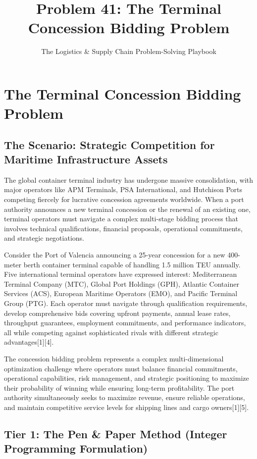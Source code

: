 \documentclass{article}
\title{Problem 41: The Terminal Concession Bidding Problem}
\author{The Logistics \& Supply Chain Problem-Solving Playbook}
\date{}
\begin{document}
\maketitle

\section{The Terminal Concession Bidding Problem}

\subsection{The Scenario: Strategic Competition for Maritime Infrastructure Assets}

The global container terminal industry has undergone massive consolidation, with major operators like APM Terminals, PSA International, and Hutchison Ports competing fiercely for lucrative concession agreements worldwide. When a port authority announces a new terminal concession or the renewal of an existing one, terminal operators must navigate a complex multi-stage bidding process that involves technical qualifications, financial proposals, operational commitments, and strategic negotiations.

Consider the Port of Valencia announcing a 25-year concession for a new 400-meter berth container terminal capable of handling 1.5 million TEU annually. Five international terminal operators have expressed interest: Mediterranean Terminal Company (MTC), Global Port Holdings (GPH), Atlantic Container Services (ACS), European Maritime Operators (EMO), and Pacific Terminal Group (PTG). Each operator must navigate through qualification requirements, develop comprehensive bids covering upfront payments, annual lease rates, throughput guarantees, employment commitments, and performance indicators, all while competing against sophisticated rivals with different strategic advantages[1][4].

The concession bidding problem represents a complex multi-dimensional optimization challenge where operators must balance financial commitments, operational capabilities, risk management, and strategic positioning to maximize their probability of winning while ensuring long-term profitability. The port authority simultaneously seeks to maximize revenue, ensure reliable operations, and maintain competitive service levels for shipping lines and cargo owners[1][5].

\subsection{Tier 1: The Pen \& Paper Method (Integer Programming Formulation)}
\end{document}
